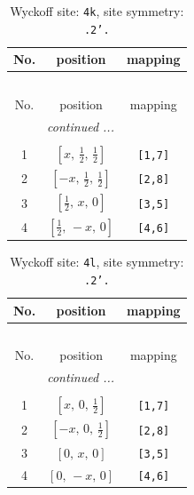 \documentclass[fleqn,8pt]{jsarticle}
\begin{document}
\renewcommand{\arraystretch}{1.2}
\begin{longtable}{ccc}
\caption{Wyckoff site: {\tt 4k}, site symmetry: {\tt .2'.}}
 \\
 \hline \hline
No. & position & mapping \\ \hline \endfirsthead

\multicolumn{2}{l}{\tablename\ \thetable{}} \\
 \hline \hline
No. & position & mapping \\ \hline \endhead

 \hline \hline
\multicolumn{2}{r}{\footnotesize\it continued ...} \\ \endfoot

 \hline \hline
\multicolumn{2}{r}{} \\ \endlastfoot

1 & $\left[ x,\, \frac{1}{2},\, \frac{1}{2} \right]$ & {\tt [1,7]} \\ \hline
2 & $\left[ - x,\, \frac{1}{2},\, \frac{1}{2} \right]$ & {\tt [2,8]} \\ \hline
3 & $\left[ \frac{1}{2},\, x,\, 0 \right]$ & {\tt [3,5]} \\ \hline
4 & $\left[ \frac{1}{2},\, - x,\, 0 \right]$ & {\tt [4,6]} \\
\end{longtable}
\renewcommand{\arraystretch}{1.2}
\begin{longtable}{ccc}
\caption{Wyckoff site: {\tt 4l}, site symmetry: {\tt .2'.}}
 \\
 \hline \hline
No. & position & mapping \\ \hline \endfirsthead

\multicolumn{2}{l}{\tablename\ \thetable{}} \\
 \hline \hline
No. & position & mapping \\ \hline \endhead

 \hline \hline
\multicolumn{2}{r}{\footnotesize\it continued ...} \\ \endfoot

 \hline \hline
\multicolumn{2}{r}{} \\ \endlastfoot

1 & $\left[ x,\, 0,\, \frac{1}{2} \right]$ & {\tt [1,7]} \\ \hline
2 & $\left[ - x,\, 0,\, \frac{1}{2} \right]$ & {\tt [2,8]} \\ \hline
3 & $\left[ 0,\, x,\, 0 \right]$ & {\tt [3,5]} \\ \hline
4 & $\left[ 0,\, - x,\, 0 \right]$ & {\tt [4,6]} \\
\end{longtable}
\end{document}
